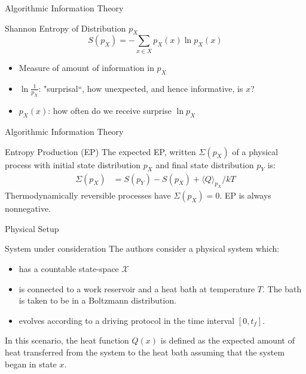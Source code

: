 \documentclass{beamer}
\begin{document}
\begin{frame}{Algorithmic Information Theory}
    \begin{block}{Shannon Entropy of Distribution $p_X$}
    \begin{equation*}
    S(p_X) = - \sum_{x\in X} p_X(x)\ln p_X(x)    
    \end{equation*}
    \begin{itemize}
        \item Measure of amount of information in $p_X$
        \item $\ln \frac{1}{p_X}$: "surprisal``, how unexpected, and hence informative, is $x$?
        \item $p_X(x)$: how often do we receive surprise $\ln p_X$
    \end{itemize}
    \end{block}
\end{frame}

\begin{frame}{Algorithmic Information Theory}
    \begin{block}{Entropy Production (EP)}
    The expected EP, written $\Sigma (p_X)$ of a physical process with initial state distribution $p_X$ and final state distribution $p_Y$ is:
    \begin{align*}
        \Sigma (p_X) &= S(p_Y) - S(p_X) + \langle Q \rangle_{p_X}/kT
    \end{align*}
    Thermodynamically reversible processes have $\Sigma (p_X)=0$. EP is always nonnegative.
    \end{block}
\end{frame}

\begin{frame}{Physical Setup}
\begin{block}{System under consideration}
The authors consider a physical system which:
\begin{itemize}
    \item has a countable state-space $\mathcal{X}$
    \item is connected to a work reservoir and a heat bath at temperature $T$. The bath is taken to be in a Boltzmann distribution.
    \item evolves according to a driving protocol in the time interval $[0,t_f]$.
\end{itemize}
In this scenario, the heat function $Q(x)$ is defined as the expected amount of heat transferred from the system to the heat bath assuming that the system began in state $x$.
\end{block}
\end{frame}
\end{document}
